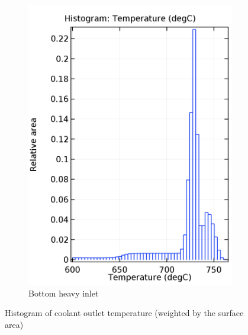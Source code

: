\documentclass{elsarticle}
\begin{document}
\begin{figure}
    \begin{subfigure}[b]{0.45\textwidth}
    \centering
    \includegraphics[width=\textwidth]{images/diffusion/mk1/SS/flow_opti/hist_bottom.png}
    \caption{Bottom heavy inlet}
    \end{subfigure}
    
    \caption{Histogram of coolant outlet temperature (weighted by the surface area)}
    \label{fig:hist_flibe}
\end{figure}




 
 








\end{document}
